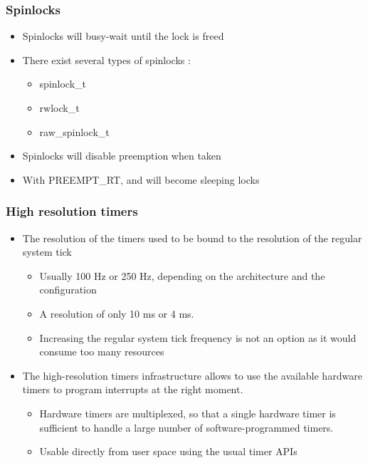 \begin{frame}
  \frametitle{Spinlocks}
	\begin{itemize}
		\item Spinlocks will busy-wait until the lock is freed
		\item There exist several types of spinlocks :
		\begin{itemize}
			\item spinlock\_t
			\item rwlock\_t
			\item raw\_spinlock\_t
		\end{itemize}
		\item Spinlocks will disable preemption when taken
		\item With PREEMPT\_RT,  and  will become sleeping locks
	\end{itemize}
\end{frame}

\begin{frame}
  \frametitle{High resolution timers}
  \begin{itemize}
  \item The resolution of the timers used to be bound to the
    resolution of the regular system tick
    \begin{itemize}
    \item Usually 100 Hz or 250 Hz, depending on the architecture and
      the configuration
    \item A resolution of only 10 ms or 4 ms.
    \item Increasing the regular system tick frequency is not an
      option as it would consume too many resources
    \end{itemize}
  \item The high-resolution timers infrastructure allows to use
    the available hardware timers to program interrupts
    at the right moment.
    \begin{itemize}
    \item Hardware timers are multiplexed, so that a single hardware
      timer is sufficient to handle a large number of
      software-programmed timers.
    \item Usable directly from user space using the usual timer APIs
    \end{itemize}
  \end{itemize}
\end{frame}

